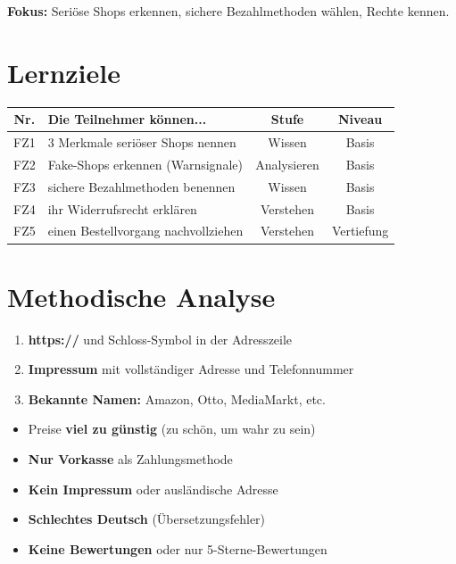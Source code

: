\documentclass[11pt,a4paper]{article}
\begin{document}
\textbf{Fokus:} Seriöse Shops erkennen, sichere Bezahlmethoden wählen, Rechte kennen.

\section{Lernziele}

\begin{tabular}{|c|p{7cm}|c|c|}
\hline
\textbf{Nr.} & \textbf{Die Teilnehmer können...} & \textbf{Stufe} & \textbf{Niveau} \\
\hline
FZ1 & 3 Merkmale seriöser Shops nennen & Wissen & Basis \\
FZ2 & Fake-Shops erkennen (Warnsignale) & Analysieren & Basis \\
FZ3 & sichere Bezahlmethoden benennen & Wissen & Basis \\
FZ4 & ihr Widerrufsrecht erklären & Verstehen & Basis \\
FZ5 & einen Bestellvorgang nachvollziehen & Verstehen & Vertiefung \\
\hline
\end{tabular}

\section{Methodische Analyse}

\begin{tippbox}
\begin{enumerate}
    \item \textbf{https://} und Schloss-Symbol in der Adresszeile
    \item \textbf{Impressum} mit vollständiger Adresse und Telefonnummer
    \item \textbf{Bekannte Namen:} Amazon, Otto, MediaMarkt, etc.
\end{enumerate}
\end{tippbox}

\begin{warnbox}
\begin{itemize}
    \item Preise \textbf{viel zu günstig} (zu schön, um wahr zu sein)
    \item \textbf{Nur Vorkasse} als Zahlungsmethode
    \item \textbf{Kein Impressum} oder ausländische Adresse
    \item \textbf{Schlechtes Deutsch} (Übersetzungsfehler)
    \item \textbf{Keine Bewertungen} oder nur 5-Sterne-Bewertungen
\end{itemize}
\end{warnbox}
\end{document}
